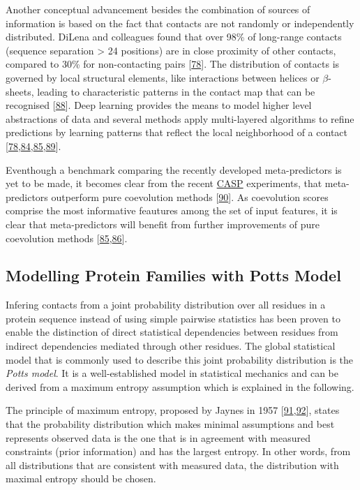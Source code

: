 \documentclass[11pt,a4paper,twoside]{book}
\theoremstyle{definition}
\theoremstyle{definition}
\theoremstyle{remark}
\begin{document}
Another conceptual advancement besides the combination of sources of
information is based on the fact that contacts are not randomly or
independently distributed. DiLena and colleagues found that over 98\% of
long-range contacts (sequence separation \textgreater{} 24 positions)
are in close proximity of other contacts, compared to 30\% for
non-contacting pairs {[}\protect\hyperlink{ref-DiLena2012a}{78}{]}. The
distribution of contacts is governed by local structural elements, like
interactions between helices or \(\beta\)-sheets, leading to
characteristic patterns in the contact map that can be recognised
{[}\protect\hyperlink{ref-Andreani2015a}{88}{]}. Deep learning provides
the means to model higher level abstractions of data and several methods
apply multi-layered algorithms to refine predictions by learning
patterns that reflect the local neighborhood of a contact
{[}\protect\hyperlink{ref-DiLena2012a}{78},\protect\hyperlink{ref-Jones2015a}{84},\protect\hyperlink{ref-Wang2016a}{85},\protect\hyperlink{ref-Skwark2014a}{89}{]}.

Eventhough a benchmark comparing the recently developed meta-predictors
is yet to be made, it becomes clear from the recent
\protect\hyperlink{abbrev}{CASP} experiments, that meta-predictors
outperform pure coevolution methods
{[}\protect\hyperlink{ref-Monastyrskyy2015}{90}{]}. As coevolution
scores comprise the most informative feautures among the set of input
features, it is clear that meta-predictors will benefit from further
improvements of pure coevolution methods
{[}\protect\hyperlink{ref-Wang2016a}{85},\protect\hyperlink{ref-Stahl2017}{86}{]}.

\subsection{Modelling Protein Families with Potts Model}\label{maxent}

Infering contacts from a joint probability distribution over all
residues in a protein sequence instead of using simple pairwise
statistics has been proven to enable the distinction of direct
statistical dependencies between residues from indirect dependencies
mediated through other residues. The global statistical model that is
commonly used to describe this joint probability distribution is the
\emph{Potts model}. It is a well-established model in statistical
mechanics and can be derived from a maximum entropy assumption which is
explained in the following.

The principle of maximum entropy, proposed by Jaynes in 1957
{[}\protect\hyperlink{ref-Jaynes1957a}{91},\protect\hyperlink{ref-Jaynes1957b}{92}{]},
states that the probability distribution which makes minimal assumptions
and best represents observed data is the one that is in agreement with
measured constraints (prior information) and has the largest entropy. In
other words, from all distributions that are consistent with measured
data, the distribution with maximal entropy should be chosen.
\end{document}
